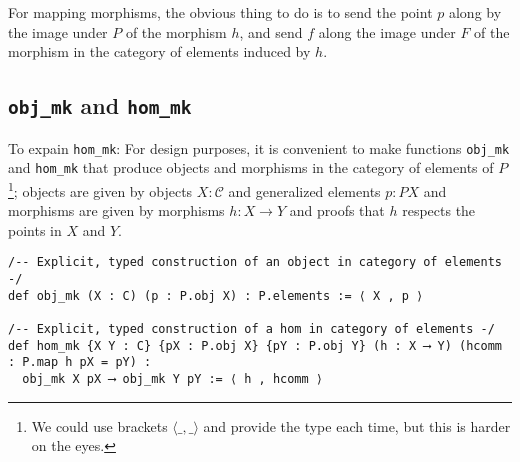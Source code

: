 \documentclass{article}
\newcommand{\CC}{\mathcal{C}}
\newcommand{\<}{\langle}
\renewcommand{\>}{\rangle}
\theoremstyle{definitionstyle}
\theoremstyle{exercisestyle}
\theoremstyle{remarkstyle}
\begin{document}
For mapping morphisms, the obvious thing to do is to send the point $p$
along by the image under $P$ of the morphism $h$,
and send $f$ along the image under $F$ of the morphism
in the category of elements induced by $h$.

\subsection{\texttt{obj\_mk} and \texttt{hom\_mk}}
To expain \texttt{hom\_mk}:
For design purposes, it is convenient to make functions \texttt{obj\_mk}
and \texttt{hom\_mk} that produce objects and morphisms in the category
of elements of $P$\footnote{We could use brackets $\<\_,\_\>$
  and provide the type each time, but this is harder on the eyes. };
objects are given by objects $X : \CC$ and generalized elements $p : P X$
and morphisms are given by morphisms $h : X \to Y$ and proofs that
$h$ respects the points in $X$ and $Y$.

\begin{lstlisting}
/-- Explicit, typed construction of an object in category of elements -/
def obj_mk (X : C) (p : P.obj X) : P.elements := ⟨ X , p ⟩

/-- Explicit, typed construction of a hom in category of elements -/
def hom_mk {X Y : C} {pX : P.obj X} {pY : P.obj Y} (h : X ⟶ Y) (hcomm : P.map h pX = pY) :
  obj_mk X pX ⟶ obj_mk Y pY := ⟨ h , hcomm ⟩\end{lstlisting}
\end{document}
